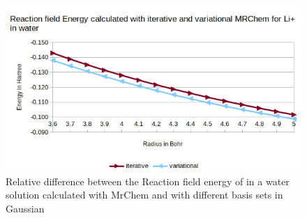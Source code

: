 \documentclass[../master_thesis.tex]{subfiles}
\begin{document}
\begin{figure}[h!]
  \centering
  \includegraphics[width=0.75\linewidth]{img/lipvarEr.png}
  \caption{Relative difference between the Reaction field energy of  in a water solution calculated with MrChem
  and with different basis sets in Gaussian}
  \label{fig:lipvarEr}
\end{figure}
\end{document}
